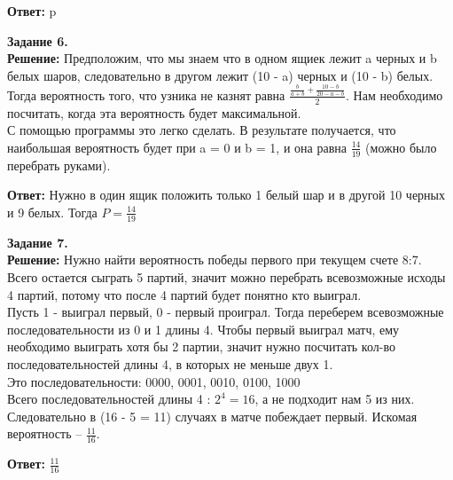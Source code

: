\documentclass[12pt,a4paper]{scrartcl}
\begin{document}
	\begin{flushright}
		\textbf{Ответ:} p
	\end{flushright}
	\textbf{Задание 6.} 
	\\
	\textbf{Решение:} Предположим, что мы знаем что в одном ящиек лежит a черных и b белых шаров, следовательно в другом лежит (10 - a) черных и (10 - b) белых. Тогда вероятность того, что узника не казнят равна $\frac{\frac{b}{a + b} + \frac{10 - b}{20 - a - b}}{2}$. Нам необходимо посчитать, когда эта вероятность будет максимальной.\\
	С помощью программы это легко сделать. В результате получается, что наибольшая вероятность будет при a = 0 и b = 1, и она равна $\frac{14}{19}$ (можно было перебрать руками).
	\begin{flushright}
		\textbf{Ответ:} Нужно в один ящик положить только 1 белый шар и в другой 10 черных и 9 белых. Тогда $P = \frac{14}{19}$
	\end{flushright}
	\textbf{Задание 7.} 
	\\
	\textbf{Решение:} Нужно найти вероятность победы первого при текущем счете 8:7. Всего остается сыграть 5 партий, значит можно перебрать всевозможные исходы 4 партий, потому что после 4 партий будет понятно кто выиграл. \\ 
	Пусть 1 - выиграл первый, 0 - первый проиграл. Тогда переберем всевозможные последовательности из 0 и 1 длины 4. Чтобы первый выиграл матч, ему необходимо выиграть хотя бы 2 партии, значит нужно посчитать кол-во последовательностей длины 4, в которых не меньше двух 1. \\
	Это последовательности: 0000, 0001, 0010, 0100, 1000\\
	Всего последовательностей длины 4 :  $2^4 = 16$, а не подходит нам 5 из них.\\
	Следовательно в (16 - 5 = 11) случаях в матче побеждает первый.
	Искомая вероятность -- $\frac{11}{16}$.
		\begin{flushright}
		\textbf{Ответ:} $\frac{11}{16}$
	\end{flushright}
\end{document}
